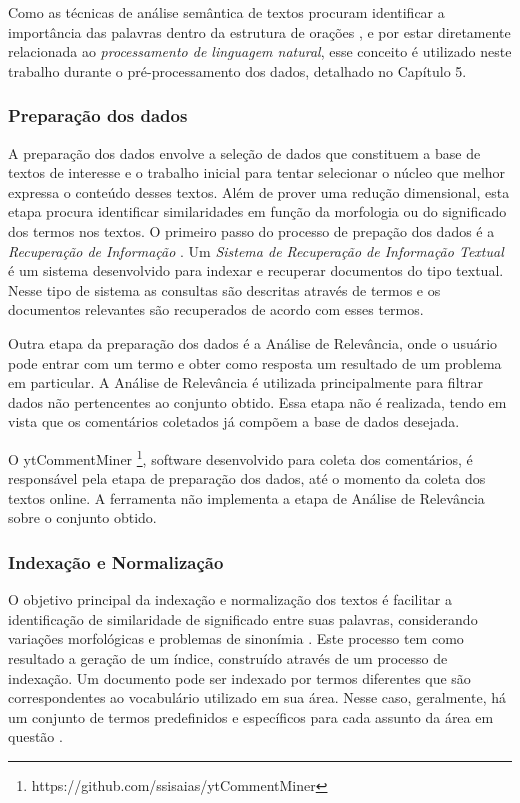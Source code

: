 Como as técnicas de análise semântica de textos procuram identificar a importância das palavras dentro da estrutura de orações \cite{morais2007mineraccao}, e por estar diretamente relacionada ao \textit{processamento de linguagem natural}, esse conceito é utilizado neste trabalho durante o pré-processamento dos dados, detalhado no Capítulo 5.


\subsubsection{Preparação dos dados}
A preparação dos dados envolve a seleção de dados que constituem a base de textos de interesse e o trabalho inicial para tentar selecionar o núcleo que melhor expressa o conteúdo desses textos. Além de prover uma redução dimensional, esta etapa procura identificar similaridades em função da morfologia ou do significado dos termos nos textos. O primeiro passo do processo de prepação dos dados é a \textit{Recuperação de Informação} \cite{morais2007mineraccao}. Um \textit{Sistema de Recuperação de Informação Textual} é um sistema desenvolvido para indexar e recuperar documentos do tipo textual. Nesse tipo de sistema as consultas são descritas através de termos e os documentos relevantes são recuperados de acordo com esses termos.

Outra etapa da preparação dos dados é a Análise de Relevância, onde o usuário pode entrar com um termo e obter como resposta um resultado de um problema em particular. A Análise de Relevância é utilizada principalmente para filtrar dados não pertencentes ao conjunto obtido. Essa etapa não é realizada, tendo em vista que os comentários coletados já compõem a base de dados desejada.

O ytCommentMiner \footnote{https://github.com/ssisaias/ytCommentMiner}, software desenvolvido para coleta dos comentários, é responsável pela etapa de preparação dos dados, até o momento da coleta dos textos online. A ferramenta não implementa a etapa de Análise de Relevância sobre o conjunto obtido.

\subsubsection{Indexação e Normalização}
O objetivo principal da indexação e normalização dos textos é facilitar a identificação de similaridade de significado entre suas palavras, considerando variações morfológicas e problemas de sinonímia \cite{morais2007mineraccao}. Este processo tem como resultado a geração de um índice, construído através de um processo de indexação. Um documento pode ser indexado por termos diferentes que são correspondentes ao vocabulário utilizado em sua área. Nesse caso, geralmente, há um conjunto de termos predefinidos e específicos para cada assunto da área em questão \cite{morais2007mineraccao}.

